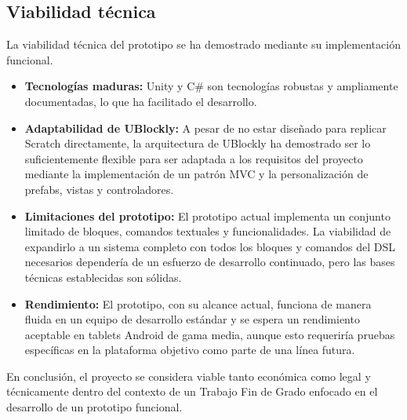 \subsection{Viabilidad técnica}
La viabilidad técnica del prototipo se ha demostrado mediante su implementación funcional.
\begin{itemize}
	\item \textbf{Tecnologías maduras:} Unity y C\# son tecnologías robustas y ampliamente documentadas, lo que ha facilitado el desarrollo.
	\item \textbf{Adaptabilidad de UBlockly:} A pesar de no estar diseñado para replicar Scratch directamente, la arquitectura de UBlockly ha demostrado ser lo suficientemente flexible para ser adaptada a los requisitos del proyecto mediante la implementación de un patrón MVC y la personalización de prefabs, vistas y controladores.
	\item \textbf{Limitaciones del prototipo:} El prototipo actual implementa un conjunto limitado de bloques, comandos textuales y funcionalidades. La viabilidad de expandirlo a un sistema completo con todos los bloques y comandos del DSL necesarios dependería de un esfuerzo de desarrollo continuado, pero las bases técnicas establecidas son sólidas.
	\item \textbf{Rendimiento:} El prototipo, con su alcance actual, funciona de manera fluida en un equipo de desarrollo estándar y se espera un rendimiento aceptable en tablets Android de gama media, aunque esto requeriría pruebas específicas en la plataforma objetivo como parte de una línea futura.
\end{itemize}
En conclusión, el proyecto se considera viable tanto económica como legal y técnicamente dentro del contexto de un Trabajo Fin de Grado enfocado en el desarrollo de un prototipo funcional.
